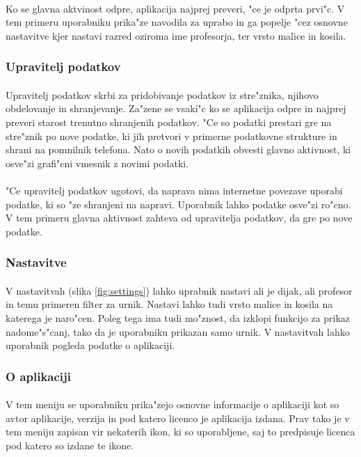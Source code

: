 \paragraph{}Ko se glavna aktvinost odpre, aplikacija najprej preveri, "ce je odprta prvi"c. V tem primeru uporabniku prika"ze navodila za uprabo in ga popelje "cez osnovne nastavitve kjer nastavi razred oziroma ime profesorja, ter vrsto malice in kosila.

\subsubsection{Upravitelj podatkov}
\paragraph{}Upravitelj podatkov skrbi za pridobivanje podatkov iz stre"znika, njihovo obdelovanje in shranjevanje. Za"zene se vsaki"c ko se aplikacija odpre in najprej preveri starost trenutno shranjenih podatkov. "Ce so podatki prestari gre na stre"znik po nove podatke, ki jih pretvori v primerne podatkovne strukture in shrani na pomnilnik telefona. Nato o novih podatkih obvesti glavno aktivnost, ki osve"zi grafi"cni vmesnik z novimi podatki.

\paragraph{}"Ce upravitelj podatkov ugotovi, da naprava nima internetne povezave uporabi podatke, ki so "ze shranjeni na napravi. Uporabnik lahko podatke osve"zi ro"cno. V tem primeru glavna aktivnost zahteva od upravitelja podatkov, da gre po nove podatke.

\subsubsection{Nastavitve}
\paragraph{}V nastavitvah (slika \ref{fig:settings}) lahko uprabnik nastavi ali je dijak, ali profesor in temu primeren filter za urnik. Nastavi lahko tudi vrsto malice in kosila na katerega je naro"cen. Poleg tega ima tudi mo"znost, da izklopi funkcijo za prikaz nadome"s"canj, tako da je uporabniku prikazan samo urnik. V nastavitvah lahko uporabnik pogleda podatke o aplikaciji.

\subsubsection{O aplikaciji}
\paragraph{}V tem meniju se uporabniku prika"zejo osnovne informacije o aplikaciji kot so avtor aplikacije, verzija in pod katero licenco\cite{license-wiki} je aplikacija izdana. Prav tako je v tem meniju zapisan vir nekaterih ikon, ki so uporabljene, saj to predpisuje licenca pod katero so izdane te ikone.
